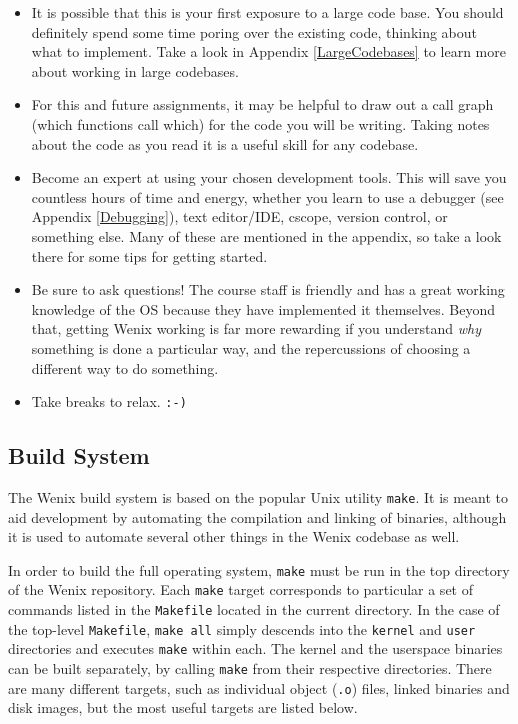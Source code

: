 \begin{itemize}
    \item It is possible that this is your first exposure to a large code base. You should definitely spend some time poring over the existing code, thinking about what to implement. Take a look in Appendix \ref{LargeCodebases} to learn more about working in large codebases.
    \item For this and future assignments, it may be helpful to draw out a call graph (which functions call which) for the code you will be writing. Taking notes about the code as you read it is a useful skill for any codebase.
    \item Become an expert at using your chosen development tools. This will save you countless hours of time and energy, whether you learn to use a debugger (see Appendix \ref{Debugging}), text editor/IDE, cscope, version control, or something else. Many of these are mentioned in the appendix, so take a look there for some tips for getting started.
    \item Be sure to ask questions! The course staff is friendly and has a great working knowledge of the OS because they have implemented it themselves. Beyond that, getting Wenix working is far more rewarding if you understand \emph{why} something is done a particular way, and the repercussions of choosing a different way to do something.
    \item Take breaks to relax. \texttt{:-)}
\end{itemize}

\subsection{Build System}
The Wenix build system is based on the popular Unix utility \texttt{make}. It is meant to aid development by automating the compilation and linking of binaries, although it is used to automate several other things in the Wenix codebase as well.

In order to build the full operating system, \texttt{make} must be run in the top directory of the Wenix repository. Each \texttt{make} target corresponds to particular a set of commands listed in the \texttt{Makefile} located in the current directory. In the case of the top-level \texttt{Makefile}, \texttt{make all} simply descends into the \texttt{kernel} and \texttt{user} directories and executes \texttt{make} within each. The kernel and the userspace binaries can be built separately, by calling \texttt{make} from their respective directories. There are many different targets, such as individual object (\texttt{.o}) files, linked binaries and disk images, but the most useful targets are listed below.
  

